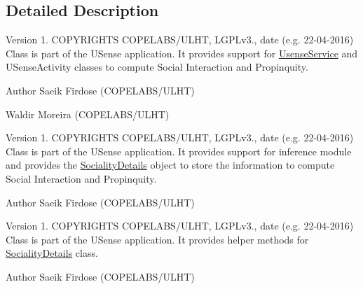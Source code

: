 \subsection{Detailed Description}
\begin{DoxyVersion}{Version}
1. C\+O\+P\+Y\+R\+I\+G\+H\+T\+S C\+O\+P\+E\+L\+A\+B\+S/\+U\+L\+H\+T, L\+G\+P\+Lv3., date (e.\+g. 22-\/04-\/2016) Class is part of the U\+Sense application. It provides support for \hyperlink{classcs_1_1usense_1_1_usense_service}{Usense\+Service} and U\+Sense\+Activity classes to compute Social Interaction and Propinquity. 
\end{DoxyVersion}
\begin{DoxyAuthor}{Author}
Saeik Firdose (C\+O\+P\+E\+L\+A\+B\+S/\+U\+L\+H\+T) 



Waldir Moreira (C\+O\+P\+E\+L\+A\+B\+S/\+U\+L\+H\+T)
\end{DoxyAuthor}
\begin{DoxyVersion}{Version}
1. C\+O\+P\+Y\+R\+I\+G\+H\+T\+S C\+O\+P\+E\+L\+A\+B\+S/\+U\+L\+H\+T, L\+G\+P\+Lv3., date (e.\+g. 22-\/04-\/2016) Class is part of the U\+Sense application. It provides support for inference module and provides the \hyperlink{classcs_1_1usense_1_1inference_module_1_1_sociality_details}{Sociality\+Details} object to store the information to compute Social Interaction and Propinquity. 
\end{DoxyVersion}
\begin{DoxyAuthor}{Author}
Saeik Firdose (C\+O\+P\+E\+L\+A\+B\+S/\+U\+L\+H\+T)
\end{DoxyAuthor}
\begin{DoxyVersion}{Version}
1. C\+O\+P\+Y\+R\+I\+G\+H\+T\+S C\+O\+P\+E\+L\+A\+B\+S/\+U\+L\+H\+T, L\+G\+P\+Lv3., date (e.\+g. 22-\/04-\/2016) Class is part of the U\+Sense application. It provides helper methods for \hyperlink{classcs_1_1usense_1_1inference_module_1_1_sociality_details}{Sociality\+Details} class. 
\end{DoxyVersion}
\begin{DoxyAuthor}{Author}
Saeik Firdose (C\+O\+P\+E\+L\+A\+B\+S/\+U\+L\+H\+T) 
\end{DoxyAuthor}
